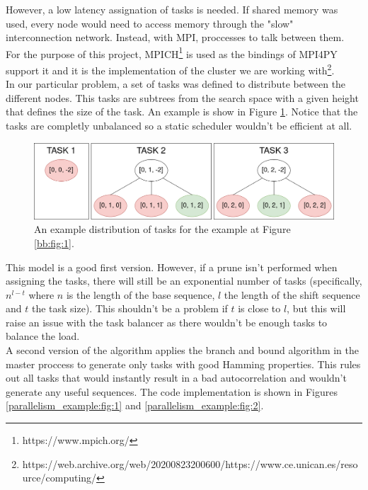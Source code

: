   However, a low latency assignation of tasks is needed. If shared
  memory was used, every node would need to access memory through the "slow"
  interconnection network. Instead, with MPI, proccesses to talk between them.\\

  For the purpose of this project, MPICH\footnote{https://www.mpich.org/} is used
  as the bindings of MPI4PY support it and it is the implementation of the cluster
  we are working with\footnote{https://web.archive.org/web/20200823200600/https://www.ce.unican.es/resource/computing/}.\\

  In our particular problem, a set of tasks was defined to
  distribute between the different nodes. This tasks are subtrees from the
  search space with a given height that defines the size of the task. An
  example is show in Figure \ref{tasks:fig:1}. Notice that the tasks are
  completly unbalanced so a static scheduler wouldn't be efficient at all.\\


  \begin{figure}[ht!]
    \begin{center}
      \includegraphics[scale=0.4]{Chapters/Implementation/Example_tasks.png}
    \end{center}
    \caption{An example distribution of tasks for the example at Figure
    \ref{bb:fig:1}.}
    \label{tasks:fig:1}
  \end{figure}

  This model is a good first version. However, if a prune isn't performed when
  assigning the tasks, there will still be an exponential number of tasks
  (specifically, $n^{l-t}$ where $n$ is the length of the base sequence, $l$ the
  length of the shift sequence and $t$ the task size). This shouldn't be a problem
  if $t$ is close to $l$, but this will raise an issue with the task balancer as
  there wouldn't be enough tasks to balance the load.\\

  A second version of the algorithm applies the branch and bound algorithm in
  the master proccess to generate only tasks with good Hamming properties.
  This rules out all tasks that would instantly result in a bad
  autocorrelation and wouldn't generate any useful sequences. The code
  implementation is shown in Figures \ref{parallelism_example:fig:1} and
  \ref{parallelism_example:fig:2}.\\

